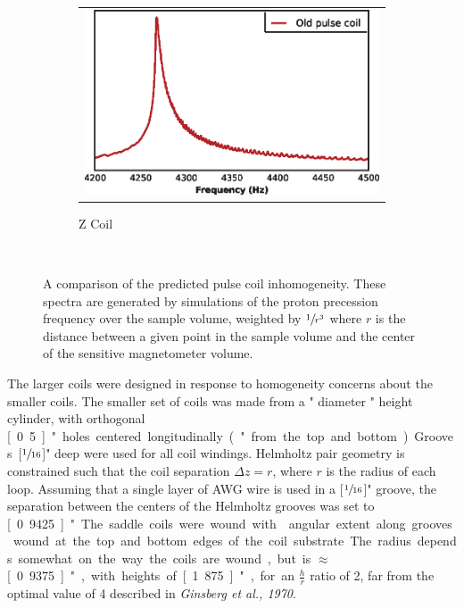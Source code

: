 \documentclass[PaulGanssle-Thesis.tex]{subfiles}
\begin{document}
\begin{figure}[t!]
\begin{subfigure}[h]{0.3\tw}
\begin{tabular}{c}
\includegraphics[width=\tw]{figures/coils/PCHomogeneityCompOZ.eps}
\end{tabular}
\caption{Z Coil}
\label{fig:PCHomogeneityComparisonZ}
\end{subfigure}\\
\caption{A comparison of the predicted pulse coil inhomogeneity. These spectra are generated by simulations of the proton precession frequency over the sample volume, weighted by $\sfrac{1}{r^3}$ where $r$ is the distance between a given point in the sample volume and the center of the sensitive magnetometer volume.}
\label{fig:PulseCoilHomogeneityComparisonFFT}
\end{figure}
The larger coils were designed in response to homogeneity concerns about the smaller coils. The smaller set of coils was made from a \unit[2]{"} diameter \unit[3]{"} height cylinder, with orthogonal \unit[0.5]{"} holes centered longitudinally (\unit[1]{"} from the top and bottom). Grooves \unit[$\sfrac{1}{16}$]{"} deep were used for all coil windings. Helmholtz pair geometry is constrained such that the coil separation $\Delta z = r$, where $r$ is the radius of each loop. Assuming that a single layer of \unit[30]{AWG} wire is used in a \unit[$\sfrac{1}{16}$]{"} groove, the separation between the centers of the Helmholtz grooves was set to \unit[0.9425]{"}.  The saddle coils were wound with \unit[120]{\degsym} angular extent along grooves wound at the top and bottom edges of the coil substrate. The radius depends somewhat on the way the coils are wound, but is $\approx$ \unit[0.9375]{"}, with heights of \unit[1.875]{"}, for an $\frac{h}{r}$ ratio of 2, far from the optimal value of 4 described in \emph{Ginsberg et al., 1970}\cite{Ginsberg1970}.
\end{document}
